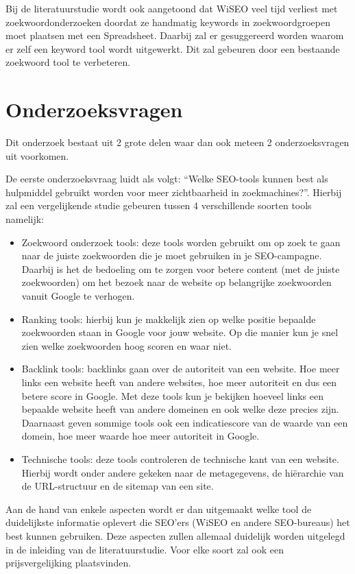 Bij de literatuurstudie wordt ook aangetoond dat WiSEO veel tijd verliest met zoekwoordonderzoeken doordat ze handmatig keywords in zoekwoordgroepen moet plaatsen met een Spreadsheet. Daarbij zal er gesuggereerd worden waarom er zelf een keyword tool wordt uitgewerkt. Dit zal gebeuren door een bestaande zoekwoord tool te verbeteren. 


\section{Onderzoeksvragen}
\label{sec:onderzoeksvragen}

Dit onderzoek bestaat uit 2 grote delen waar dan ook meteen 2 onderzoeksvragen uit voorkomen. 

De eerste onderzoeksvraag luidt als volgt: “Welke SEO-tools kunnen best als hulpmiddel gebruikt worden voor meer zichtbaarheid in zoekmachines?”. Hierbij zal een vergelijkende studie gebeuren tussen 4 verschillende soorten tools namelijk: 

\begin{itemize}
\item Zoekwoord onderzoek tools: deze tools worden gebruikt om op zoek te gaan naar de juiste zoekwoorden die je moet gebruiken in je SEO-campagne. Daarbij is het de bedoeling om te zorgen voor betere content (met de juiste zoekwoorden) om het bezoek naar de website op belangrijke zoekwoorden vanuit Google te verhogen. 
\item Ranking tools: hierbij kun je makkelijk zien op welke positie bepaalde zoekwoorden staan in Google voor jouw website. Op die manier kun je snel zien welke zoekwoorden hoog scoren en waar niet. 
\item Backlink tools: backlinks gaan over de autoriteit van een website. Hoe meer links een website heeft van andere websites, hoe meer autoriteit en dus een betere score in Google. Met deze tools kun je bekijken hoeveel links een bepaalde website heeft van andere domeinen en ook welke deze precies zijn. Daarnaast geven sommige tools ook een indicatiescore van de waarde van een domein, hoe meer waarde hoe meer autoriteit in Google.
\item Technische tools: deze tools controleren de technische kant van een website. Hierbij wordt onder andere gekeken naar de metagegevens, de hiërarchie van de URL-structuur en de sitemap van een site.  
\end{itemize}

Aan de hand van enkele aspecten wordt er dan uitgemaakt welke tool de duidelijkste informatie oplevert die SEO'ers (WiSEO en andere SEO-bureaus) het best kunnen gebruiken. Deze aspecten zullen allemaal duidelijk worden uitgelegd in de inleiding van de literatuurstudie. Voor elke soort zal ook een prijsvergelijking plaatsvinden. 

